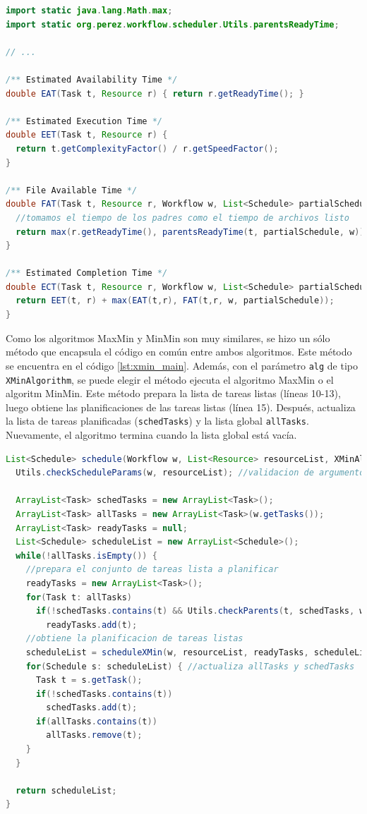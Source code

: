 \begin{lstlisting}[language=java,label={code:xmin_defs},caption={Definiciones comunes para MaxMin y MinMin.},float]
import static java.lang.Math.max; 
import static org.perez.workflow.scheduler.Utils.parentsReadyTime;

// ...

/** Estimated Availability Time */
double EAT(Task t, Resource r) { return r.getReadyTime(); }

/** Estimated Execution Time */
double EET(Task t, Resource r) { 
  return t.getComplexityFactor() / r.getSpeedFactor(); 
}

/** File Available Time */
double FAT(Task t, Resource r, Workflow w, List<Schedule> partialSchedule) {
  //tomamos el tiempo de los padres como el tiempo de archivos listo
  return max(r.getReadyTime(), parentsReadyTime(t, partialSchedule, w));
}

/** Estimated Completion Time */
double ECT(Task t, Resource r, Workflow w, List<Schedule> partialSchedule) {
  return EET(t, r) + max(EAT(t,r), FAT(t,r, w, partialSchedule));
}
\end{lstlisting}

Como los algoritmos MaxMin y MinMin son muy similares, se hizo un sólo método que encapsula el código en común entre ambos algoritmos. Este método se encuentra en el código \ref{lst:xmin_main}. Además, con el parámetro \texttt{alg} de tipo \texttt{XMinAlgorithm}, se puede elegir el método ejecuta el algoritmo MaxMin o el algoritm MinMin. Este método prepara la lista de tareas listas (líneas 10-13), luego obtiene las planificaciones de las tareas listas (línea 15). Después, actualiza la lista de tareas planificadas (\texttt{schedTasks}) y la lista global \texttt{allTasks}. Nuevamente, el algoritmo termina cuando la lista global está vacía.

\begin{lstlisting}[language=java,label={lst:xmin_main},caption={Método principal para los algoritmos MaxMin y MinMin.},float]
List<Schedule> schedule(Workflow w, List<Resource> resourceList, XMinAlgorithm alg) {
  Utils.checkScheduleParams(w, resourceList); //validacion de argumentos

  ArrayList<Task> schedTasks = new ArrayList<Task>();
  ArrayList<Task> allTasks = new ArrayList<Task>(w.getTasks());
  ArrayList<Task> readyTasks = null;
  List<Schedule> scheduleList = new ArrayList<Schedule>();
  while(!allTasks.isEmpty()) {
    //prepara el conjunto de tareas lista a planificar
    readyTasks = new ArrayList<Task>();
    for(Task t: allTasks)
      if(!schedTasks.contains(t) && Utils.checkParents(t, schedTasks, w))
        readyTasks.add(t);
    //obtiene la planificacion de tareas listas
    scheduleList = scheduleXMin(w, resourceList, readyTasks, scheduleList, alg);
    for(Schedule s: scheduleList) { //actualiza allTasks y schedTasks
      Task t = s.getTask();
      if(!schedTasks.contains(t))
        schedTasks.add(t);
      if(allTasks.contains(t))
        allTasks.remove(t);
    }
  }

  return scheduleList;
}
\end{lstlisting}

